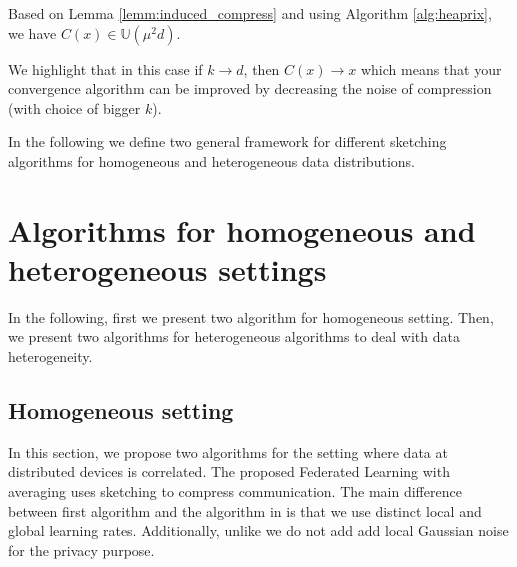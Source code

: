 \documentclass[review,onefignum,onetabnum]{siamart190516}
\begin{document}
\begin{corollary}
Based on Lemma \ref{lemm:induced_compress} and using Algorithm \ref{alg:heaprix}, we have $C(x)\in \mathbb{U}(\mu^2 d)$.
\end{corollary}
\begin{remark}
We highlight that in this case if $k\rightarrow d$, then $C(x)\rightarrow x$ which means that your convergence algorithm can be improved by decreasing the noise of compression (with choice of bigger $k$). 
\end{remark}

In the following we define two general framework for different sketching algorithms for homogeneous and heterogeneous data distributions.


\section{Algorithms for homogeneous and heterogeneous settings}\label{sec:algos}
In the following, first we present two algorithm for homogeneous setting. Then, we present two algorithms for heterogeneous algorithms to deal with data heterogeneity.   

\subsection{Homogeneous setting}
In this section, we propose two algorithms for the setting where data at distributed devices is  correlated. The proposed Federated Learning with averaging uses sketching to compress communication. The main difference between first algorithm and the algorithm in \cite{li2019privacy} is that we use distinct local and global learning rates. Additionally, unlike \cite{li2019privacy} we do not add add local Gaussian noise for the privacy purpose. 
\end{document}
